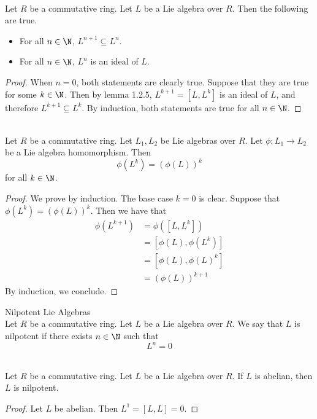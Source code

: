 \documentclass[a4paper]{article}
\begin{document}
\begin{lmm}{}{}\\
Let $R$ be a commutative ring. Let $L$ be a Lie algebra over $R$. Then the following are true. 
\begin{itemize}
\item For all $n\in\N$, $L^{n+1}\subseteq L^n$. 
\item For all $n\in\N$, $L^n$ is an ideal of $L$. 
\end{itemize} 
\begin{proof}
When $n=0$, both statements are clearly true. Suppose that they are true for some $k\in\N$. Then by lemma 1.2.5, $L^{k+1}=[L,L^k]$ is an ideal of $L$, and therefore $L^{k+1}\subseteq L^k$. By induction, both statements are true for all $n\in\N$. 
\end{proof}
\end{lmm}

\begin{lmm}{}{}\\
Let $R$ be a commutative ring. Let $L_1,L_2$ be Lie algebras over $R$. Let $\phi:L_1\to L_2$ be a Lie algebra homomorphism. Then $$\phi(L^k)=(\phi(L))^k$$ for all $k\in\N$. 
\begin{proof}
We prove by induction. The base case $k=0$ is clear. Suppose that $\phi(L^k)=(\phi(L))^k$. Then we have that 
\begin{align*}
\phi(L^{k+1})&=\phi([L,L^k])\\
&=[\phi(L),\phi(L^k)]\\
&=[\phi(L),\phi(L)^k]\\
&=(\phi(L))^{k+1}
\end{align*}
By induction, we conclude. 
\end{proof}
\end{lmm}

\begin{defn}{Nilpotent Lie Algebras}{}\\
Let $R$ be a commutative ring. Let $L$ be a Lie algebra over $R$. We say that $L$ is nilpotent if there exists $n\in\N$ such that $$L^n=0$$
\end{defn}

\begin{lmm}{}{}\\
Let $R$ be a commutative ring. Let $L$ be a Lie algebra over $R$. If $L$ is abelian, then $L$ is nilpotent. 
\begin{proof}
Let $L$ be abelian. Then $L^1=[L,L]=0$. 
\end{proof}
\end{lmm}
\end{document}
